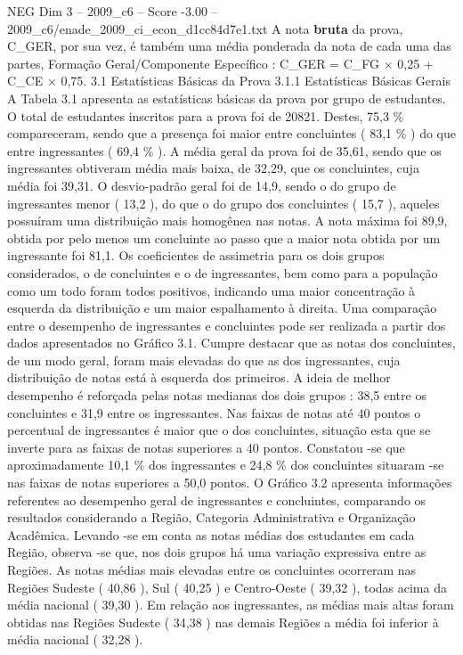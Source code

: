 \begin{textsample}{NEG Dim 3 – 2009\_c6 – Score -3.00 – 2009\_c6/enade\_2009\_ci\_econ\_d1cc84d7e1.txt}
A nota \textbf{bruta} da prova, C\_GER, por sua vez, é também uma média ponderada da nota de cada uma das partes, Formação Geral/Componente Específico : C\_GER = C\_FG × 0,25 + C\_CE × 0,75. 3.1 Estatísticas Básicas da Prova 3.1.1 Estatísticas Básicas Gerais A Tabela 3.1 apresenta as estatísticas básicas da prova por grupo de estudantes.
O total de estudantes inscritos para a prova foi de 20821.
Destes, 75,3 \% compareceram, sendo que a presença foi maior entre concluintes ( 83,1 \% ) do que entre ingressantes ( 69,4 \% ).
A média geral da prova foi de 35,61, sendo que os ingressantes obtiveram média mais baixa, de 32,29, que os concluintes, cuja média foi 39,31.
O desvio-padrão geral foi de 14,9, sendo o do grupo de ingressantes menor ( 13,2 ), do que o do grupo dos concluintes ( 15,7 ), aqueles possuíram uma distribuição mais homogênea nas notas.
A nota máxima foi 89,9, obtida por pelo menos um concluinte ao passo que a maior nota obtida por um ingressante foi 81,1.
Os coeficientes de assimetria para os dois grupos considerados, o de concluintes e o de ingressantes, bem como para a população como um todo foram todos positivos, indicando uma maior concentração à esquerda da distribuição e um maior espalhamento à direita.
Uma comparação entre o desempenho de ingressantes e concluintes pode ser realizada a partir dos dados apresentados no Gráfico 3.1.
Cumpre destacar que as notas dos concluintes, de um modo geral, foram mais elevadas do que as dos ingressantes, cuja distribuição de notas está à esquerda dos primeiros.
A ideia de melhor desempenho é reforçada pelas notas medianas dos dois grupos : 38,5 entre os concluintes e 31,9 entre os ingressantes.
Nas faixas de notas até 40 pontos o percentual de ingressantes é maior que o dos concluintes, situação esta que se inverte para as faixas de notas superiores a 40 pontos.
Constatou -se que aproximadamente 10,1 \% dos ingressantes e 24,8 \% dos concluintes situaram -se nas faixas de notas superiores a 50,0 pontos.
O Gráfico 3.2 apresenta informações referentes ao desempenho geral de ingressantes e concluintes, comparando os resultados considerando a Região, Categoria Administrativa e Organização Acadêmica.
Levando -se em conta as notas médias dos estudantes em cada Região, observa -se que, nos dois grupos há uma variação expressiva entre as Regiões.
As notas médias mais elevadas entre os concluintes ocorreram nas Regiões Sudeste ( 40,86 ), Sul ( 40,25 ) e Centro-Oeste ( 39,32 ), todas acima da média nacional ( 39,30 ).
Em relação aos ingressantes, as médias mais altas foram obtidas nas Regiões Sudeste ( 34,38 ) nas demais Regiões a média foi inferior à média nacional ( 32,28 ).

\end{textsample}
